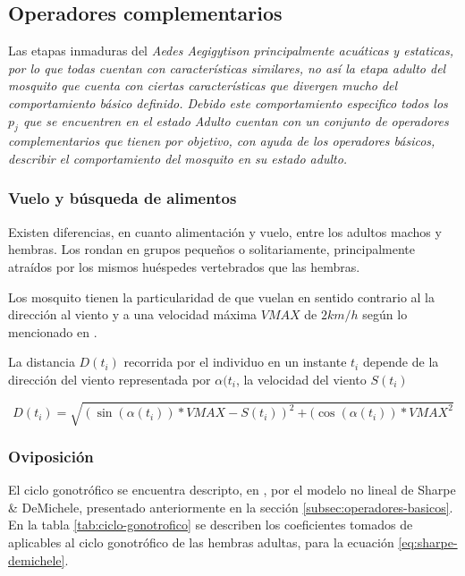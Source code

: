
\subsection{Operadores complementarios}
Las etapas inmaduras del \em Aedes Aegigyti\em son principalmente acuáticas y estaticas, por lo que todas cuentan con
características similares, no así la etapa adulto del mosquito que cuenta con ciertas características que divergen
mucho del comportamiento básico definido. Debido este comportamiento especifico todos los $p_{j}$ que se encuentren en
el estado \em Adulto \em cuentan con un conjunto de operadores complementarios que tienen por objetivo, con ayuda de
los operadores básicos, describir el comportamiento del mosquito en su estado adulto.

\subsubsection{Vuelo y búsqueda de alimentos}
Existen diferencias, en cuanto alimentación y vuelo, entre los adultos machos y hembras. Los rondan en grupos pequeños
o solitariamente, principalmente atraídos por los mismos huéspedes vertebrados que las hembras.

Los mosquito tienen la particularidad de que vuelan en sentido contrario al la dirección al viento y a una velocidad máxima $VMAX$ de $2 km/h$ según lo mencionado en \cite{web-site:speedAnimals}.

La distancia $D(t_{i})$ recorrida por el individuo en un instante $t_{i}$  depende de la dirección del viento
representada por $\alpha(t_{i}$, la velocidad del viento $S(t_{i})$

\begin{equation}
 D (t_{i}) = \sqrt{{(\sin(\alpha(t_{i})) * VMAX  - S(t_{i}))}^{2}
  + {(\cos(\alpha(t_{i})) * VMAX} ^{2} }
\end{equation}

\subsubsection{Oviposición}
El ciclo gonotrófico se encuentra descripto, en \cite{otero2006stochastic}, por el modelo no lineal de Sharpe 
\& DeMichele, presentado anteriormente en la sección \ref{subsec:operadores-basicos}. En la tabla 
\ref{tab:ciclo-gonotrofico} se describen los coeficientes tomados de \cite{otero2006stochastic} aplicables al 
ciclo gonotrófico de las hembras adultas, para la ecuación \eqref{eq:sharpe-demichele}.

